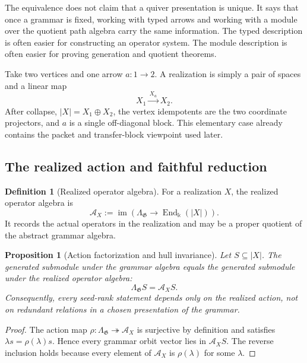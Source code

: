 \documentclass[11pt]{article}
\newtheorem{proposition}[proposition]{Proposition}
\theoremstyle{definition}
\newtheorem{definition}[definition]{Definition}
\theoremstyle{remark}
\theoremstyle{definition}\newtheorem{example}[theorem]{Example}
\newcommand{\bbk}{\Bbbk}
\newcommand{\A}{\mathcal A}
\newcommand{\End}{\operatorname{End}}
\newcommand{\im}{\operatorname{im}}
\newcommand{\RecordID}[1]{\label{record:#1}}
\newcommand{\Depends}[1]{}
\begin{document}
\begin{interpretation}
The equivalence does not claim that a quiver presentation is unique.  It says that once a grammar is fixed, working with typed arrows and working with a module over the quotient path algebra carry the same information.  The typed description is often easier for constructing an operator system.  The module description is often easier for proving generation and quotient theorems.
\end{interpretation}

\begin{microexample}[title={A two-vertex grammar}]
Take two vertices and one arrow \(a:1\to2\).  A realization is simply a pair of spaces and a linear map
\[
X_1\xrightarrow{\,X_a\,}X_2.
\]
After collapse, \(|X|=X_1\oplus X_2\), the vertex idempotents are the two coordinate projectors, and \(a\) is a single off-diagonal block.  This elementary case already contains the packet and transfer-block viewpoint used later.
\end{microexample}


\subsection{The realized action and faithful reduction}
\begin{definition}[Realized operator algebra]
\label{def:realized-algebra}
For a realization $X$, the realized operator algebra is
\[
\A_X:=\im\!\left(\Lambda_{\mathfrak G}\longrightarrow\End_{\bbk}(|X|)\right).
\]
It records the actual operators in the realization and may be a proper quotient of the abstract grammar algebra.
\end{definition}
\RecordID{PSC-I-D-REALIZED-ALGEBRA}

\begin{proposition}[Action factorization and hull invariance]
\label{prop:action-factorization}
Let $S\subseteq |X|$.  The generated submodule under the grammar algebra equals the generated submodule under the realized operator algebra:
\[
\Lambda_{\mathfrak G}S=\A_XS.
\]
Consequently, every seed-rank statement depends only on the realized action, not on redundant relations in a chosen presentation of the grammar.
\end{proposition}
\RecordID{PSC-I-P-ACTION-FACTORIZATION}
\Depends{PSC-I-D-REALIZED-ALGEBRA.}

\begin{proof}
The action map $\rho:\Lambda_{\mathfrak G}\twoheadrightarrow\A_X$ is surjective by definition and satisfies $\lambda s=\rho(\lambda)s$.  Hence every grammar orbit vector lies in $\A_XS$.  The reverse inclusion holds because every element of $\A_X$ is $\rho(\lambda)$ for some $\lambda$.
\end{proof}
\end{document}
